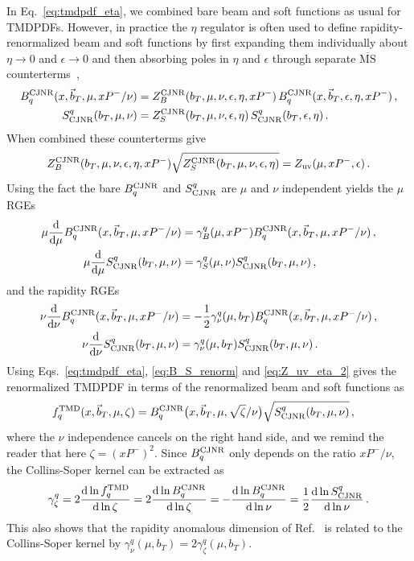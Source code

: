 \documentclass[11pt,a4paper]{article}
\DeclareRobustCommand{\eq}[1]{Eq.~\eqref{eq:#1}}
\newcommand{\MS}{\overline{\mathrm{MS}}}
\newcommand{\df}{\mathrm{d}}
\newcommand{\eps}{\epsilon}
\newcommand{\nn}{\nonumber}
\newcommand\TMD{\mathrm{TMD}}
\newcommand{\bt}{\vec b_T}
\begin{document}
In \eq{tmdpdf_eta}, we combined bare beam and soft functions as usual for TMDPDFs.
However, in practice the $\eta$ regulator is often used to define rapidity-renormalized beam and soft functions
by first expanding them individually about $\eta\to 0$ and $\epsilon \to 0$ and then absorbing poles in $\eta$ and $\eps$ through separate $\MS$ counterterms~\cite{Chiu:2012ir},
\begin{align} \label{eq:B_S_renorm}
 B_q^{\rm CJNR}(x, \bt, \mu, x P^-/\nu) &= Z_B^{\rm CJNR}(b_T, \mu, \nu, \eps, \eta, x P^-) \, B_q^{\rm CJNR}(x, \bt, \eps, \eta, x P^-)
\,,\nn\\
 S^q_{\rm CJNR}(b_T,\mu,\nu) &= Z_S^{\rm CJNR}(b_T, \mu, \nu, \eps, \eta) \, S^q_{\rm CJNR}(b_T,\eps,\eta)
\,.\end{align}
When combined these counterterms give
\begin{align} \label{eq:Z_uv_eta_2}
 Z_B^{\rm CJNR}(b_T, \mu, \nu, \eps, \eta, x P^-) \sqrt{Z_S^{\rm CJNR}(b_T, \mu, \nu, \eps, \eta)} = Z_{\rm uv}(\mu, x P^-, \eps)
\,.\end{align}
Using the fact the bare $B_q^{\rm CJNR}$ and $S^q_{\rm CJNR}$ are $\mu$ and $\nu$ independent yields the $\mu$ RGEs
\begin{align}
 \mu \frac{\df}{\df\mu} B_q^{\rm CJNR}(x, \bt, \mu, x P^-/\nu) &= \gamma_B^q(\mu, x P^-) B_q^{\rm CJNR}(x, \bt, \mu, x P^-/\nu)
\,,\nn\\
 \mu \frac{\df}{\df\mu} S^q_{\rm CJNR}(b_T,\mu,\nu) &= \gamma_S^q(\mu, \nu) S^q_{\rm CJNR}(b_T,\mu,\nu)
 \,,
\end{align}
and the rapidity RGEs
\begin{align}
 \nu \frac{\df}{\df\nu} B_q^{\rm CJNR}(x, \bt, \mu, x P^-/\nu) &= -\frac{1}{2} \gamma_\nu^q(\mu, b_T) B_q^{\rm CJNR}(x, \bt, \mu, x P^-/\nu)
\,,\nn\\
 \nu \frac{\df}{\df\nu} S^q_{\rm CJNR}(b_T,\mu,\nu) &= \gamma_\nu^q(\mu, b_T) S^q_{\rm CJNR}(b_T,\mu,\nu)
\,.\end{align}
Using Eqs.~\eqref{eq:tmdpdf_eta}, \eqref{eq:B_S_renorm} and \eqref{eq:Z_uv_eta_2} gives the renormalized TMDPDF in terms of the renormalized beam and soft functions as
\begin{align} \label{eq:tmdpdf_eta_ren}
f^\TMD_q(x, \bt, \mu, \zeta) &=  B_q^{\rm CJNR}\bigl(x, \bt, \mu, \sqrt{\zeta}/\nu\bigr) \sqrt{S^q_{\rm CJNR}(b_T,\mu,\nu)}
\,,\end{align}
where the $\nu$ independence cancels on the right hand side, and we remind the reader that here $\zeta = (x P^-)^2$.
Since $B_q^{\rm CJNR}$ only depends on the ratio $x P^-/\nu$, the Collins-Soper kernel can be extracted as
\begin{align}
 \gamma_\zeta^q = 2 \frac{\df\ln f_q^\TMD}{\df\ln \zeta} = 2 \frac{\df\ln B_q^{\rm CJNR}}{\df\ln \zeta}
 = - \frac{\df\ln B_q^{\rm CJNR}}{\df\ln\nu} = \frac{1}{2} \frac{\df\ln S^q_{\rm CJNR}}{\df\ln\nu}
\,.\end{align}
This also shows that the rapidity anomalous dimension of Ref.~\cite{Chiu:2012ir} is related to the Collins-Soper kernel by $\gamma_\nu^q(\mu,b_T) = 2 \gamma_\zeta^q(\mu,b_T)$.
\end{document}
